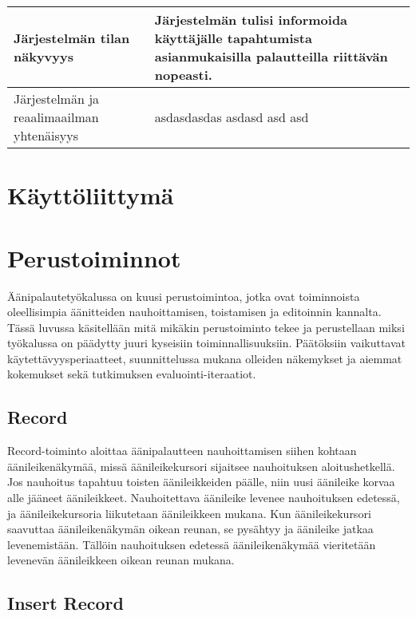 \documentclass[utf8]{gradu3}
\begin{document}
\begin{center}
\begin{tabular}[t]{|p{5cm}|p{5cm}|}
    \hline
    Järjestelmän tilan näkyvyys  & Järjestelmän tulisi informoida käyttäjälle tapahtumista asianmukaisilla palautteilla riittävän nopeasti. \\
    \hline
	Järjestelmän ja reaalimaailman yhtenäisyys  & asdasdasdas asdasd asd asd \\
    \hline
\end{tabular}
\end{center}


\section{Käyttöliittymä}

\section{Perustoiminnot}

Äänipalautetyökalussa on kuusi perustoimintoa, jotka ovat toiminnoista oleellisimpia äänitteiden nauhoittamisen, toistamisen ja editoinnin kannalta. Tässä luvussa käsitellään mitä mikäkin perustoiminto tekee ja perustellaan miksi työkalussa on päädytty juuri kyseisiin toiminnallisuuksiin. Päätöksiin vaikuttavat käytettävyysperiaatteet, suunnittelussa mukana olleiden näkemykset ja aiemmat kokemukset sekä tutkimuksen evaluointi-iteraatiot.


\subsection{Record}

Record-toiminto aloittaa äänipalautteen nauhoittamisen siihen kohtaan äänileikenäkymää, missä äänileikekursori sijaitsee nauhoituksen aloitushetkellä. Jos nauhoitus tapahtuu toisten äänileikkeiden päälle, niin uusi äänileike korvaa alle jääneet äänileikkeet. Nauhoitettava äänileike levenee nauhoituksen edetessä, ja äänileikekursoria liikutetaan äänileikkeen mukana. Kun äänileikekursori saavuttaa äänileikenäkymän oikean reunan, se pysähtyy ja äänileike jatkaa levenemistään. Tällöin nauhoituksen edetessä äänileikenäkymää vieritetään levenevän äänileikkeen oikean reunan mukana.

\subsection{Insert Record}
\end{document}
